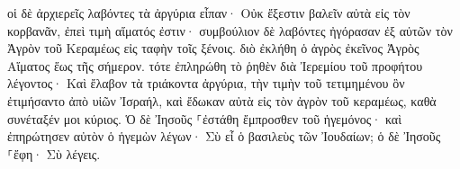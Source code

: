 \documentclass{openreader}
\begin{document}
οἱ δὲ ἀρχιερεῖς λαβόντες τὰ ἀργύρια εἶπαν· Οὐκ ἔξεστιν βαλεῖν αὐτὰ εἰς τὸν κορβανᾶν, ἐπεὶ τιμὴ αἵματός ἐστιν· 
συμβούλιον δὲ λαβόντες ἠγόρασαν ἐξ αὐτῶν τὸν Ἀγρὸν τοῦ Κεραμέως εἰς ταφὴν τοῖς ξένοις. 
διὸ ἐκλήθη ὁ ἀγρὸς ἐκεῖνος Ἀγρὸς Αἵματος ἕως τῆς σήμερον. 
τότε ἐπληρώθη τὸ ῥηθὲν διὰ Ἰερεμίου τοῦ προφήτου λέγοντος· Καὶ ἔλαβον τὰ τριάκοντα ἀργύρια, τὴν τιμὴν τοῦ τετιμημένου ὃν ἐτιμήσαντο ἀπὸ υἱῶν Ἰσραήλ, 
καὶ ἔδωκαν αὐτὰ εἰς τὸν ἀγρὸν τοῦ κεραμέως, καθὰ συνέταξέν μοι κύριος. 
Ὁ δὲ Ἰησοῦς ⸀ἐστάθη ἔμπροσθεν τοῦ ἡγεμόνος· καὶ ἐπηρώτησεν αὐτὸν ὁ ἡγεμὼν λέγων· Σὺ εἶ ὁ βασιλεὺς τῶν Ἰουδαίων; ὁ δὲ Ἰησοῦς ⸀ἔφη· Σὺ λέγεις. 
\end{document}
